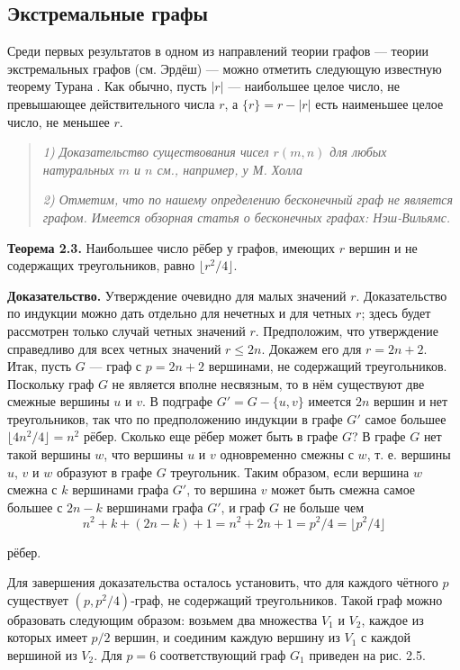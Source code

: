 \subsection{Экстремальные графы}

Среди первых результатов в одном из направлений теории графов — теории экстремальных графов (см. Эрдёш) — можно отметить следующую известную теорему Турана . Как обычно, пусть \(|r|\) — наибольшее целое число, не превышающее действительного числа \(r\), а \(\{r\} = r - |r|\) есть наименьшее целое число, не меньшее \(r\).

\begin{quote}
    \textit{1) Доказательство существования чисел \(r(m, n)\) для любых натуральных \(m\) и \(n\) см., например, у М. Холла}

    \textit{2) Отметим, что по нашему определению бесконечный граф не является графом. Имеется обзорная статья о бесконечных графах: Нэш-Вильямс.}
\end{quote}

    \textbf{Теорема 2.3.} Наибольшее число рёбер у графов, имеющих \(r\) вершин и не содержащих треугольников, равно \(\lfloor r^2/4 \rfloor\).

\textbf{Доказательство.} Утверждение очевидно для малых значений \(r\). Доказательство по индукции можно дать отдельно для нечетных и для четных \(r\); здесь будет рассмотрен только случай четных значений \(r\). Предположим, что утверждение справедливо для всех четных значений \(r \leq 2n\). Докажем его для \(r = 2n + 2\). Итак, пусть \(G\) — граф с \(p = 2n + 2\) вершинами, не содержащий треугольников. Поскольку граф \(G\) не является вполне несвязным, то в нём существуют две смежные вершины \(u\) и \(v\). В подграфе \(G' = G - \{u, v\}\) имеется \(2n\) вершин и нет треугольников, так что по предположению индукции в графе \(G'\) самое большее \(\lfloor 4n^2/4 \rfloor = n^2\) рёбер. Сколько еще рёбер может быть в графе \(G\)? В графе \(G\) нет такой вершины \(w\), что вершины \(u\) и \(v\) одновременно смежны с \(w\), т. е. вершины \(u\), \(v\) и \(w\) образуют в графе \(G\) треугольник. Таким образом, если вершина \(w\) смежна с \(k\) вершинами графа \(G'\), то вершина \(v\) может быть смежна самое большее с \(2n - k\) вершинами графа \(G'\), и граф \(G\) не больше чем \[
n^2 + k + (2n - k) + 1 = n^2 + 2n + 1 = p^2/4 = \lfloor p^2/4 \rfloor
\]

рёбер.

Для завершения доказательства осталось установить, что для каждого чётного \(p\) существует \((p, p^2/4)\)-граф, не содержащий треугольников. Такой граф можно образовать следующим образом: возьмем два множества \(V_1\) и \(V_2\), каждое из которых имеет \(p/2\) вершин, и соединим каждую вершину из \(V_1\) с каждой вершиной из \(V_2\). Для \(p = 6\) соответствующий граф \(G_1\) приведен на рис. 2.5.

